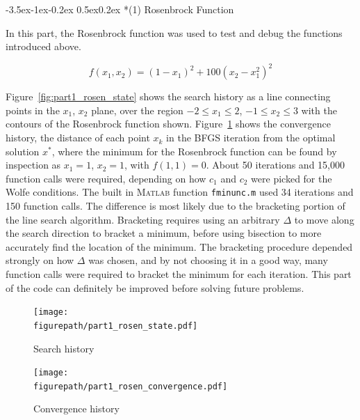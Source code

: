 \documentclass[11pt,letterpaper,onecolumn,notitlepage]{article}
\makeatletter
\newcommand{\figurepath}{../fig/hw1}
\renewcommand\subsection{\@startsection{subsection}{1}{\z@}%
{-3.5ex\@plus-1ex\@minus-0.2ex}%
{0.5ex\@plus0.2ex}%
{\fontsize{10pt}{10pt}\selectfont\bfseries\sffamily}}
\makeatother
\begin{document}
  \subsection*{(1) Rosenbrock Function}

  In this part, the Rosenbrock function was used to test and debug the functions introduced above.

  \begin{equation*}
    f(x_{1},x_{2})=(1-x_{1})^{2}+100(x_{2}-x_{1}^{2})^{2}
  \end{equation*}

  Figure~\ref{fig:part1_rosen_state} shows the search history as a line connecting points in the $x_{1}$, $x_{2}$ plane, over the region $-2\leq x_{1}\leq2$, $-1\leq x_{2}\leq 3$ with the contours of the Rosenbrock function shown.
  Figure~\ref{fig:part1_rosen_convergence} shows the convergence history, the distance of each point $x_{k}$ in the BFGS iteration from the optimal solution $x^{*}$, where the minimum for the Rosenbrock function can be found by inspection as $x_{1}=1$, $x_{2}=1$, with $f(1,1)=0$.
  About 50 iterations and 15,000 function calls were required, depending on how $c_{1}$ and $c_{2}$ were picked for the Wolfe conditions.
  The built in \textsc{Matlab} function \texttt{fminunc.m} used 34 iterations and 150 function calls.
  The difference is most likely due to the bracketing portion of the line search algorithm.
  Bracketing requires using an arbitrary $\Delta$ to move along the search direction to bracket a minimum, before using bisection to more accurately find the location of the minimum.
  The bracketing procedure depended strongly on how $\Delta$ was chosen, and by not choosing it in a good way, many function calls were required to bracket the minimum for each iteration.
  This part of the code can definitely be improved before solving future problems.

  \begin{figure}[H]
    \centering
    \begin{minipage}{.48\textwidth}
      \centering
      \texttt{[image: \\figurepath/part1\_rosen\_state.pdf]}
      \caption{Search history\label{fig:part1_rosen_state}}
    \end{minipage}
    \hfill
    \begin{minipage}{.48\textwidth}
      \centering
      \texttt{[image: \\figurepath/part1\_rosen\_convergence.pdf]}
      \caption{Convergence history\label{fig:part1_rosen_convergence}}
    \end{minipage}
  \end{figure}
\end{document}
